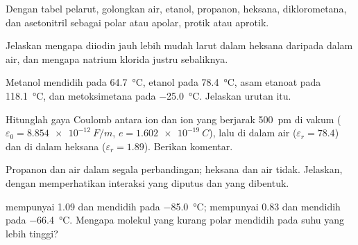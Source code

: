 \begin{exercise}[$\star$]\label{exo:b1:intermolecular-forces-solvents:3}
Dengan tabel pelarut, golongkan air, etanol, propanon, heksana,
diklorometana, dan asetonitril sebagai polar atau apolar, protik atau
aprotik.
\end{exercise}

\begin{exercise}[$\star$]\label{exo:b1:intermolecular-forces-solvents:4}
Jelaskan mengapa diiodin jauh lebih mudah larut dalam heksana daripada
dalam air, dan mengapa natrium klorida justru sebaliknya.
\end{exercise}

\begin{exercise}[$\star\star$]\label{exo:b1:intermolecular-forces-solvents:5}
Metanol mendidih pada \qty{64.7}{\celsius}, etanol pada
\qty{78.4}{\celsius}, asam etanoat pada \qty{118.1}{\celsius}, dan
metoksimetana pada \qty{-25.0}{\celsius}. Jelaskan urutan itu.
\end{exercise}

\begin{exercise}[$\star\star$]\label{exo:b1:intermolecular-forces-solvents:6}
Hitunglah gaya Coulomb antara ion  dan ion  yang
berjarak \qty{500}{pm} di vakum ($\varepsilon_0 = \qty{8.854e-12}{F/m}$,
$e = \qty{1.602e-19}{C}$), lalu di dalam air ($\varepsilon_r = 78.4$) dan
di dalam heksana ($\varepsilon_r = 1.89$). Berikan komentar.
\end{exercise}

\begin{exercise}[$\star\star$]\label{exo:b1:intermolecular-forces-solvents:7}
Propanon dan air  dalam segala perbandingan; heksana dan
air tidak. Jelaskan, dengan memperhatikan interaksi yang diputus dan yang
dibentuk.
\end{exercise}

\begin{exercise}[$\star\star$]\label{exo:b1:intermolecular-forces-solvents:8}
 mempunyai  \qty{1.09}{\debye} dan mendidih pada
\qty{-85.0}{\celsius};  mempunyai \qty{0.83}{\debye} dan mendidih
pada \qty{-66.4}{\celsius}. Mengapa molekul yang kurang polar mendidih
pada suhu yang lebih tinggi?
\end{exercise}

